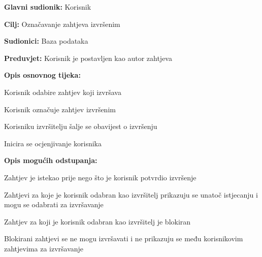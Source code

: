 					\noindent {}
					\begin{packed_item}
						
						\item \textbf{Glavni sudionik: }Korisnik
						\item  \textbf{Cilj:} Označavanje zahtjeva izvršenim 
						\item  \textbf{Sudionici:} Baza podataka
						\item  \textbf{Preduvjet:} Korisnik je postavljen kao autor zahtjeva
						\item  \textbf{Opis osnovnog tijeka:}
						
						\item[] \begin{packed_enum}
							
							\item Korisnik odabire zahtjev koji izvršava
							\item Korisnik označuje zahtjev izvršenim
							\item Korisniku izvršitelju šalje se obavijest o izvršenju
							\item Inicira se ocjenjivanje korisnika
							
						\end{packed_enum}
					
						
						
						
						
						
						
						
						\item  \textbf{Opis mogućih odstupanja:}
							
							\item[] \begin{packed_item}
															
							\item[1.a] Zahtjev je istekao prije nego što je korisnik potvrdio izvršenje
							\item[] \begin{packed_enum}
								
								\item Zahtjevi za koje je korisnik odabran kao izvršitelj prikazuju se unatoč istjecanju i mogu se odabrati za izvršavanje
								
							\end{packed_enum}
							\item[1.b] Zahtjev za koji je korisnik odabran kao izvršitelj je blokiran
							\item[] \begin{packed_enum}
								
								\item Blokirani zahtjevi se ne mogu izvršavati i ne prikazuju se među korisnikovim zahtjevima za izvršavanje
								
									\end{packed_enum}
							

						\end{packed_item}
				\end{packed_item}
				
